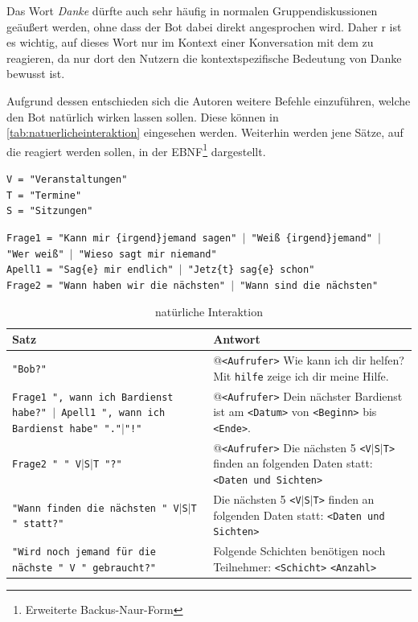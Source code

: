 Das Wort \textit{Danke} dürfte auch sehr häufig in normalen Gruppendiskussionen geäußert werden, ohne dass der Bot dabei direkt angesprochen wird. Daher r ist es wichtig, auf dieses Wort nur im Kontext einer Konversation mit dem zu reagieren, da nur dort den Nutzern die kontextspezifische Bedeutung von Danke bewusst ist.

Aufgrund dessen entschieden sich die Autoren weitere Befehle einzuführen, welche den Bot natürlich wirken lassen sollen. Diese können in \autoref{tab:natuerlicheinteraktion} eingesehen werden. Weiterhin werden jene Sätze, auf die reagiert werden sollen, in der EBNF\footnote{Erweiterte Backus-Naur-Form} dargestellt.

\texttt{V = "Veranstaltungen"}\\
\texttt{T = "Termine"}\\
\texttt{S = "{}Sitzungen"}

\texttt{Frage1 = "Kann mir \{irgend\}jemand sagen"{} $|$ "Weiß \{irgend\}jemand"{} $|$\\ "Wer weiß"{} $|$ "Wieso sagt mir niemand"}\\
\texttt{Apell1 = "{}Sag\{e\} mir endlich"{} $|$ "Jetz\{t\} sag\{e\} schon"}\\
\texttt{Frage2 = "Wann haben wir die nächsten"{} $|$ "Wann sind die nächsten"}

\begin{table}[H]
\centering
\begin{tabularx}{\textwidth}{|p{5cm}|X|}
	\hline
	\textbf{Satz} & \textbf{Antwort} \\
	\hline
	\texttt{"Bob?"} & @\texttt{<Aufrufer>} Wie kann ich dir helfen? Mit \texttt{hilfe} zeige ich dir meine Hilfe. \\
	\hline
	{\texttt{Frage1 ", wann ich Bardienst habe?"{} $|$ Apell1 ", wann ich Bardienst habe"{} "."$|$"!"}} & @\texttt{<Aufrufer>} Dein nächster Bardienst ist am \texttt{<Datum>} von \texttt{<Beginn>} bis \texttt{<Ende>}.\\
	\hline
	\texttt{Frage2 "{} "{} V$|$S$|$T "?"} & @\texttt{<Aufrufer>} Die nächsten 5 \texttt{<V$|$S$|$T>} finden an folgenden Daten statt: \texttt{<Daten und Sichten>}\\
	\hline
	\texttt{"Wann finden die nächsten "{} V$|$S$|$T "{} statt?"} & Die nächsten 5 \texttt{<V$|$S$|$T>} finden an folgenden Daten statt: \texttt{<Daten und Sichten>}\\
	\hline
	\texttt{"Wird noch jemand für die nächste "{} V "{} gebraucht?"} &  Folgende Schichten benötigen noch Teilnehmer: \texttt{<Schicht>} \texttt{<Anzahl>} \\
	\hline
\end{tabularx}
\caption{natürliche Interaktion}
\label{tab:natuerlicheinteraktion}
\end{table}


